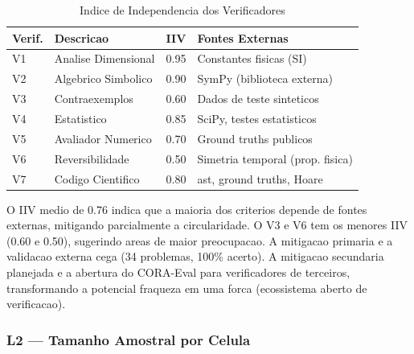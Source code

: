 \begin{table}[H]\centering\footnotesize
\caption{Indice de Independencia dos Verificadores}
\label{tab:iiv}
\begin{tabular}{p{}p{}p{}p{}}
\toprule
\textbf{Verif.} & \textbf{Descricao} & \textbf{IIV} & \textbf{Fontes Externas} \\
\midrule
V1 & Analise Dimensional & 0.95 & Constantes fisicas (SI) \\
V2 & Algebrico Simbolico & 0.90 & SymPy (biblioteca externa) \\
V3 & Contraexemplos & 0.60 & Dados de teste sinteticos \\
V4 & Estatistico & 0.85 & SciPy, testes estatisticos \\
V5 & Avaliador Numerico & 0.70 & Ground truths publicos \\
V6 & Reversibilidade & 0.50 & Simetria temporal (prop. fisica) \\
V7 & Codigo Cientifico & 0.80 & ast, ground truths, Hoare \\
\bottomrule
\end{tabular}
\end{table}

O IIV medio de 0.76 indica que a maioria dos criterios depende de fontes
externas, mitigando parcialmente a circularidade. O V3 e V6 tem os menores
IIV (0.60 e 0.50), sugerindo areas de maior preocupacao. A mitigacao
primaria e a validacao externa cega (34 problemas, 100\% acerto). A
mitigacao secundaria planejada e a abertura do CORA-Eval para
verificadores de terceiros, transformando a potencial fraqueza em uma
forca (ecossistema aberto de verificacao).

\subsubsection{L2 --- Tamanho Amostral por Celula}

